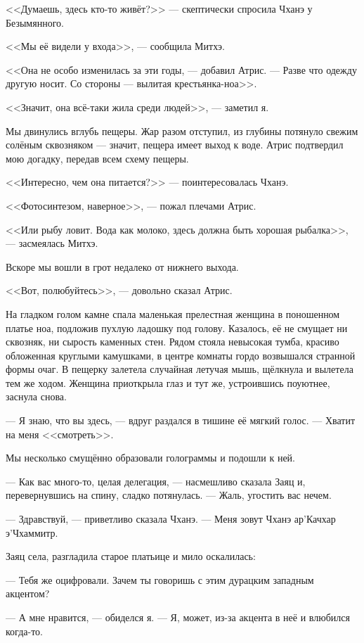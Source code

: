 <<Думаешь, здесь кто-то живёт?>> --- скептически спросила Чханэ у Безымянного.

<<Мы её видели у входа>>, --- сообщила Митхэ.

<<Она не особо изменилась за эти годы, --- добавил Атрис.
--- Разве что одежду другую носит.
Со стороны --- вылитая крестьянка-ноа>>.

<<Значит, она всё-таки жила среди людей>>, --- заметил я.

Мы двинулись вглубь пещеры.
Жар разом отступил, из глубины потянуло свежим солёным сквозняком --- значит, пещера имеет выход к воде.
Атрис подтвердил мою догадку, передав всем схему пещеры.

<<Интересно, чем она питается?>> --- поинтересовалась Чханэ.

<<Фотосинтезом, наверное>>, --- пожал плечами Атрис.

<<Или рыбу ловит.
Вода как молоко, здесь должна быть хорошая рыбалка>>, --- засмеялась Митхэ.

Вскоре мы вошли в грот недалеко от нижнего выхода.

<<Вот, полюбуйтесь>>, --- довольно сказал Атрис.

На гладком голом камне спала маленькая прелестная женщина в поношенном платье ноа, подложив пухлую ладошку под голову.
Казалось, её не смущает ни сквозняк, ни сырость каменных стен.
Рядом стояла невысокая тумба, красиво обложенная круглыми камушками, в центре комнаты гордо возвышался странной формы очаг.
В пещерку залетела случайная летучая мышь, щёлкнула и вылетела тем же ходом.
Женщина приоткрыла глаз и тут же, устроившись поуютнее, заснула снова.

--- Я знаю, что вы здесь, --- вдруг раздался в тишине её мягкий голос.
--- Хватит на меня <<смотреть>>.

Мы несколько смущённо образовали голограммы и подошли к ней.

--- Как вас много-то, целая делегация, --- насмешливо сказала Заяц и, перевернувшись на спину, сладко потянулась.
--- Жаль, угостить вас нечем.

--- Здравствуй, --- приветливо сказала Чханэ.
--- Меня зовут Чханэ ар’Качхар э’Чхаммитр.

Заяц села, разгладила старое платьице и мило оскалилась:

--- Тебя же оцифровали.
Зачем ты говоришь с этим дурацким западным акцентом?

--- А мне нравится, --- обиделся я.
--- Я, может, из-за акцента в неё и влюбился когда-то.

